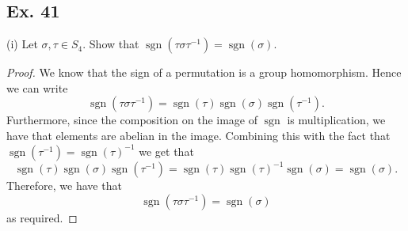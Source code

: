 \documentclass{article}
\DeclareMathOperator*{\sgn}{sgn}
\newenvironment{hwproof}[1]
{
    #1
    \begin{proof}
}{
    \end{proof}
}
\begin{document}
\subsection*{Ex. 41}
\begin{hwproof}
    {
        (i) Let $\sigma, \tau \in S_4$. Show that
        $\sgn(\tau\sigma\tau^{-1}) = \sgn(\sigma)$.
    }

    We know that the sign of a permutation is a group homomorphism. Hence we can
    write
    \begin{equation*}
        \sgn(\tau \sigma \tau^{-1}) = \sgn(\tau)\sgn(\sigma)\sgn(\tau^{-1}).
    \end{equation*}
    Furthermore, since the composition on the image of $\sgn$ is multiplication,
    we have that elements are abelian in the image. Combining this with the fact
    that $\sgn(\tau^{-1}) = \sgn(\tau)^{-1}$ we get that
    \begin{equation*}
        \sgn(\tau)\sgn(\sigma)\sgn(\tau^{-1}) = \sgn(\tau)\sgn(\tau)^{-1}\sgn(\sigma)
        = \sgn(\sigma).
    \end{equation*}
    Therefore, we have that
    \begin{equation*}
        \sgn(\tau\sigma\tau^{-1}) = \sgn(\sigma)
    \end{equation*}
    as required.
\end{hwproof}
\end{document}
